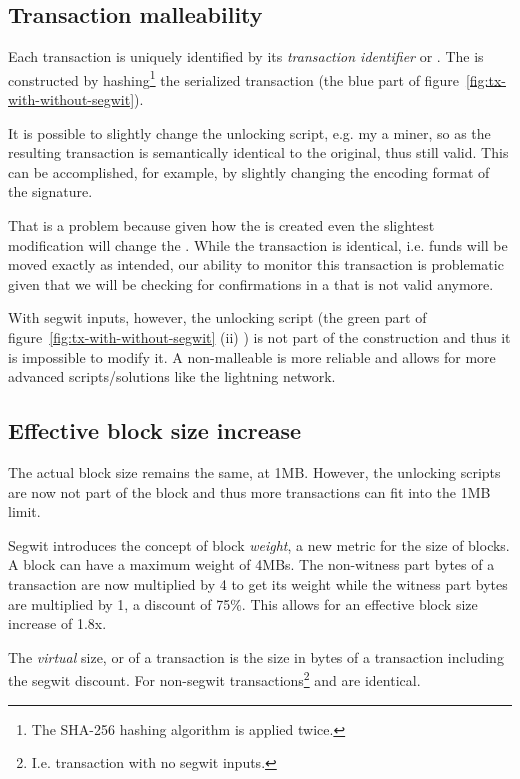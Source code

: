 \subsection*{Transaction malleability}
Each transaction is uniquely identified by its \emph{transaction identifier} or . The  is constructed by hashing\footnote{The SHA-256 hashing algorithm is applied twice.} the serialized transaction (the blue part of figure~\ref{fig:tx-with-without-segwit}).

It is possible to slightly change the unlocking script, e.g. my a miner,  so as the resulting transaction is semantically identical to the original, thus still valid. This can be accomplished, for example, by slightly changing the encoding format of the signature.

That is a problem because given how the  is created even the slightest modification will change the . While the transaction is identical, i.e. funds will be moved exactly as intended, our ability to monitor this transaction is problematic given that we will be checking for confirmations in a  that is not valid anymore.

With segwit inputs, however, the unlocking script (the green part of figure~\ref{fig:tx-with-without-segwit} (ii) ) is not part of the  construction and thus it is impossible to modify it. A non-malleable  is more reliable and allows for more advanced scripts/solutions like the lightning network.


\subsection*{Effective block size increase}
The actual block size remains the same, at 1MB. However, the unlocking scripts are now not part of the block and thus more transactions can fit into the 1MB limit.

Segwit introduces the concept of block \emph{weight}, a new metric for the size of blocks. A block can have a maximum weight of 4MBs. The non-witness part bytes of a transaction are now multiplied by 4 to get its weight while the witness part bytes are multiplied by 1, a discount of 75\%. This allows for an effective block size increase of 1.8x.

The \emph{virtual} size, or  of a transaction is the size in bytes of a transaction including the segwit discount. For non-segwit transactions\footnote{I.e. transaction with no segwit inputs.}  and  are identical.


